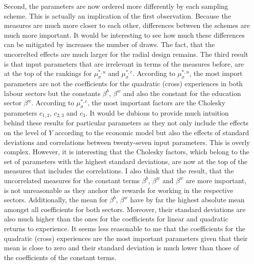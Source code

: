 \documentclass[a4paper,12pt]{article}
\begin{document}
Second, the parameters are now ordered more differently by each sampling scheme. This is actually an implication of the first observation. Because the measures are much more closer to each other, differences between the schemes are much more important. It would be interesting to see how much these differences can be mitigated by increases the number of draws. The fact, that the uncorrelted effects are much larger for the radial design remains. The third result is that input parameters that are irrelevant in terms of the measures before, are at the top of the rankings for $\mu^{*,u}_{\sigma}$ and $\mu^{*,c}_{\sigma}$. According to $\mu^{*,u}_{\sigma}$, the most import parameters are not the coefficients for the quadratic (cross) experiences in both labour sectors but the constants $\beta^b$, $\beta^w$ and also the constant for the education sector $\beta^w$. According to $\mu^{*,c}_{\sigma}$, the most important factors are the Cholesky parameters $c_{1,3}$, $c_{2,3}$ and $c_{3}$. It would be dubious to provide much intuition behind these results for particular parameters as they not only include the effects on the level of $Y$ according to the economic model but also the effects of standard deviations and correlations between twenty-seven input parameters. This is overly complex. However, it is interesting that the Cholesky factors, which belong to the set of parameters with the highest standard deviations, are now at the top of the measures that includes the correlations. I also think that the result, that the uncorrelated measures for the constant terms $\beta^b$, $\beta^w$ and $\beta^w$ are more important, is not unreasonable as they anchor the rewards for working in the respective sectors. Additionally, the mean for $\beta^b$, $\beta^w$ have by far the highest absolute mean amongst all coefficients for both sectors. Moreover, their standard deviations are also much higher than the ones for the coefficients for linear and quadratic returns to experience. It seems less reasonable to me that the coefficients for the quadratic (cross) experiences are the most important parameters given that their mean is close to zero and their standard deviation is much lower than those of the coefficients of the constant terms.\\
\end{document}
